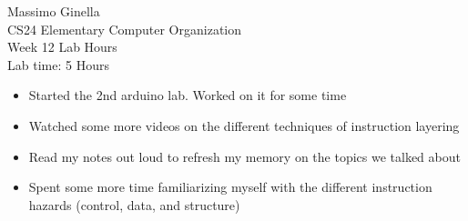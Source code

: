 \documentclass[12pt]{article}
\begin{document}
	\begin{center}
		Massimo Ginella \\
		CS24 Elementary Computer Organization \\
		Week 12 Lab Hours \\
		Lab time: 5 Hours \vspace{0.5cm} \\
	\end{center}
	
	\begin{itemize}
		\item Started the 2nd arduino lab. Worked on it for some time
		\item Watched some more videos on the different techniques of instruction layering
		\item Read my notes out loud to refresh my memory on the topics we talked about
		\item Spent some more time familiarizing myself with the different instruction hazards (control, data, and structure)
	\end{itemize}
	
	
	
\end{document}
